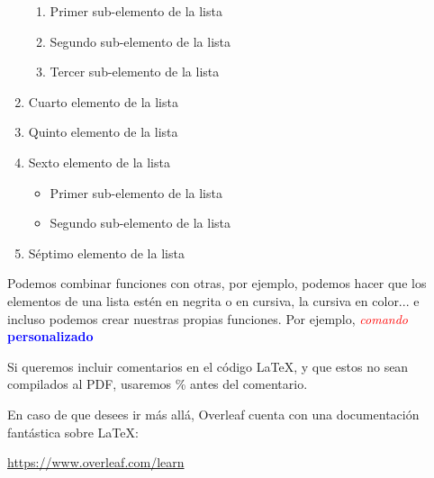 \documentclass[10pt, a4paper, landscape]{article}
\newcommand{\mycustomcommand}{\textcolor{red}{\textit{comando}} \textcolor{blue}{\textbf{personalizado}}}
\begin{document}
\begin{multicols}{3}
\begin{enumerate}[leftmargin=*, label=\alph{*})]
			\begin{enumerate}[leftmargin=*, label=a\arabic{*}:]
				\item Primer sub-elemento de la lista
				\item Segundo sub-elemento de la lista
                \item Tercer sub-elemento de la lista
			\end{enumerate}
			
			\item Cuarto elemento de la lista
            \item Quinto elemento de la lista
            \item Sexto elemento de la lista
            
			\begin{itemize}[leftmargin=*]
				\item Primer sub-elemento de la lista
				\item Segundo sub-elemento de la lista
			\end{itemize}
			
			\item Séptimo elemento de la lista
		\end{enumerate}
        
        Podemos combinar funciones con otras, por ejemplo, podemos hacer que los elementos de una lista estén en negrita o en cursiva, la cursiva en color... e incluso podemos crear nuestras propias funciones. Por ejemplo, \mycustomcommand

        Si queremos incluir comentarios en el código \LaTeX, y que estos no sean compilados al PDF, usaremos \% antes del comentario.

        \vspace{0.5cm}
        
        En caso de que desees ir más allá, Overleaf cuenta con una documentación fantástica sobre \LaTeX:

        \begin{center}
            \href{https://www.overleaf.com/learn}{https://www.overleaf.com/learn}
        \end{center}
    \end{multicols}

\end{document}
